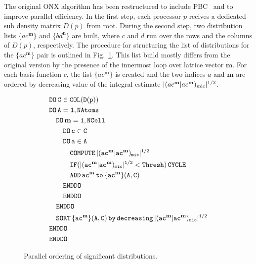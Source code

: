 \documentclass[prl,twocolumn,showpacs,twocolumngrid,superbib]{revtex4}
\begin{document}
The original ONX algorithm has been restructured 
to include PBC~\cite{CTymczak04b} and to improve parallel efficiency.
In the first step, each processor $p$ recives a dedicated sub density matrix $D(p)$ from root.
During the second step, two distribution lists $\{ac^\mathbf{m}\}$ and
$\{bd^\mathbf{n}\}$ are built, where $c$ and $d$ run over the rows and the
columns of $D(p)$, respectively. The procedure for structuring the list of distributions
for the $\{ac^\mathbf{m}\}$ pair is outlined in Fig.~\ref{Fig:List}.
This list build mostly differs from the original version by the presence
of the innermost loop over lattice vector $\mathbf{m}$. For
each basis function $c$, the list $\{ac^\mathbf{m}\}$ is created and the 
two indices $a$ and $\mathbf{m}$ are ordered by decreasing value 
of the integral estimate $|(ac^\mathbf{m}|ac^\mathbf{m})_{\rm mic}|^{1/2}$.

\begin{figure}[htbp]
  \centering
  \caption{\protect
    Parallel ordering of significant distributions. 
  }\label{Fig:List}
  \begin{equation*}
    \begin{split}
      &\tt          DO\,C\in COL(D(p))\\
      &\tt          DO\,A=1,NAtoms\\
      &\tt\quad       DO\,\mathbf{m}=1,NCell\\
      &\tt\qquad        DO\,c\in C\\
      &\tt\qquad        DO\,a\in A\\
      &\tt\qquad\quad     COMPUTE\,|(ac^\mathbf{m}|ac^\mathbf{m})_{mic}|^{1/2}\\
      &\tt\qquad\quad     IF(|(ac^\mathbf{m}|ac^\mathbf{m})_{mic}|^{1/2}<{\tt Thresh)\,CYCLE}\\
      &\tt\qquad\quad     ADD\,ac^\mathbf{m}\,{\tt to}\, \{ac^\mathbf{m}\}(A,C)\\
      &\tt\qquad        ENDDO\\
      &\tt\qquad        ENDDO\\
      &\tt\quad       ENDDO\\
      &\tt\quad       SORT\,\{ac^\mathbf{m}\}(A,C)\,by\,decreasing\,|(ac^\mathbf{m}|ac^\mathbf{m})_{mic}|^{1/2}\\
      &\tt         ENDDO\\
      &\tt         ENDDO
    \end{split}
  \end{equation*}
\end{figure}
\end{document}
